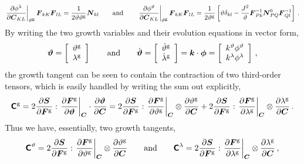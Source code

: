 \documentclass[10pt,letterpaper,oneside]{report}
\newcommand{\ten}[1]{\mbox{\boldmath $#1$}{}}
\newcommand{\tenf}[1]{\mbox{{\sffamily{\bfseries {#1}}}}}
\newcommand{\scas}[1]{\mbox{{\scriptsize{${\rm{#1}}$}}}{}}
\newcommand{\tens}[1]{\mbox{\boldmath{\scriptsize{$#1$}}}{}}
\begin{document}
\begin{equation*}
\left. \frac{ \partial \phi^{\lambda} }{ \partial \ten{C}_{KL} } \right|_{\vartheta^{\scas{g}}} \ten{F}_{kK} \ten{F}_{lL} 
= \frac{1}{2 \vartheta \vartheta^{\scas{g}}} \ten{N}_{kl} 
\qquad \mbox{and} \qquad 
\left. \frac{ \partial \phi^{\vartheta} }{ \partial \ten{C}_{KL} } \right|_{\vartheta^{\scas{g}}} \ten{F}_{kK} \ten{F}_{lL} 
= \frac{1}{2 \vartheta^{\scas{g}}} \left[ \vartheta \delta_{kl} - \frac{J^2}{\vartheta} \ten{F}^{-1}_{Pk} \ten{N}^0_{PQ} \ten{F}^{-1}_{Ql} \right] \, .
\end{equation*}
By writing the two growth variables and their evolution equations in vector form, 
\begin{equation}
\ten{\vartheta} = \left[ \begin{array}{c} \vartheta^{\scas{g}} \\ \lambda^{\scas{g}} \end{array} \right] 
\qquad \mbox{and} \qquad
\dot{\ten{\vartheta} } = \left[ \begin{array}{c} \dot{\vartheta}^{\scas{g}} \\ \dot{\lambda}^{\scas{g}} \end{array} \right]  = \ten{k} \cdot \ten{\phi} = \left[ \begin{array}{c} k^{\vartheta} \phi^{\vartheta} \\ k^{\lambda} \phi^{\lambda} \end{array} \right] \, ,
\end{equation}
the growth tangent can be seen to contain the contraction of two third-order tensors, which is easily handled by writing the sum out explicitly, 
\begin{equation}
\tenf{C}^{\scas{g}} = 2 \frac{\partial \ten{S} }{\partial \ten{F}^{\scas{g}} } : \left. \frac{\partial \ten{F}^{\scas{g}} }{\partial \ten{\vartheta} } \right|_{\tens{C}} \cdot \frac{\partial \ten{\vartheta} }{\partial \ten{C}} = 2 \frac{\partial \ten{S} }{\partial \ten{F}^{\scas{g}} } : \left. \frac{\partial \ten{F}^{\scas{g}} }{\partial \vartheta^{\scas{g}} } \right|_{\tens{C}} \otimes \frac{\partial  \vartheta^{\scas{g}} }{\partial \ten{C}} + 2 \frac{\partial \ten{S} }{\partial \ten{F}^{\scas{g}} } : \left. \frac{\partial \ten{F}^{\scas{g}} }{\partial \lambda^{\scas{g}} } \right|_{\tens{C}} \otimes \frac{\partial \lambda^{\scas{g}} }{\partial \ten{C}} \, . 
\end{equation}
Thus we have, essentially, two growth tangents,
\begin{equation}
\tenf{C}^\vartheta = 2 \frac{\partial \ten{S} }{\partial \ten{F}^{\scas{g}} } : \left. \frac{\partial \ten{F}^{\scas{g}} }{\partial \vartheta^{\scas{g}} } \right|_{\tens{C}} \otimes \frac{\partial  \vartheta^{\scas{g}} }{\partial \ten{C}}  
\qquad \mbox{and} \qquad 
\tenf{C}^\lambda = 2 \frac{\partial \ten{S} }{\partial \ten{F}^{\scas{g}} } : \left. \frac{\partial \ten{F}^{\scas{g}} }{\partial \lambda^{\scas{g}} } \right|_{\tens{C}} \otimes \frac{\partial \lambda^{\scas{g}} }{\partial \ten{C}} \, , 
\end{equation}
\end{document}
